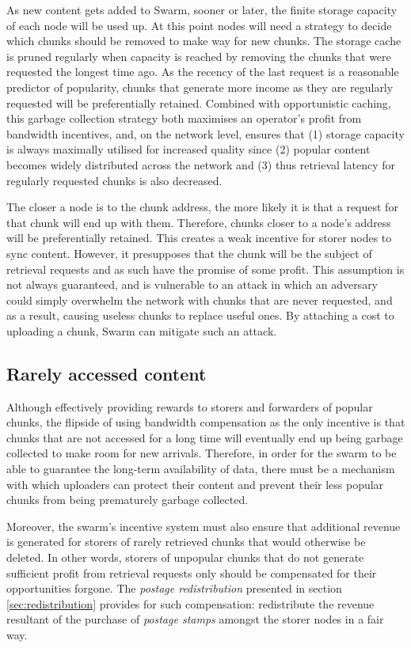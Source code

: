 As new content gets added to Swarm, sooner or later, the finite storage capacity of each node will be used up. At this point nodes will need a strategy to decide which chunks should be removed to make way for new chunks. 
The storage cache is pruned regularly when capacity is reached by removing the chunks that were requested the longest time ago. As the recency of the last request is a reasonable predictor of popularity, chunks that generate more income as they are regularly requested will be preferentially retained. Combined with opportunistic caching, this garbage collection strategy both maximises an operator's profit from bandwidth incentives, and, on the network level, ensures that (1) storage capacity is always maximally utilised for increased quality since (2) popular content becomes widely distributed across the network and (3) thus retrieval latency for regularly requested chunks is also decreased.

The closer a node is to the chunk address, the more likely it is that a request for that chunk will end up with them. Therefore, chunks closer to a node's address will be preferentially retained. This creates a weak incentive for storer nodes to sync content. However, it presupposes that the chunk will be the subject of retrieval requests and as such have the promise of some profit. This assumption is not always guaranteed, and is vulnerable to an attack in which an adversary could simply overwhelm the network with chunks that are never requested, and as a result, causing useless chunks to replace useful ones. By attaching a cost to uploading a chunk, Swarm can mitigate such an attack.

\subsection{Rarely accessed content}\label{sec:rarely-accessed-content}

Although effectively providing rewards to storers and forwarders of popular chunks, the flipside of using bandwidth compensation as the only incentive is that chunks that are not accessed for a long time will eventually end up being garbage collected to make room for new arrivals. Therefore, in order for the swarm to be able to guarantee the long-term availability of data, there must be a mechanism with which uploaders can protect their content and prevent their less popular chunks from being prematurely garbage collected.

Moreover, the swarm's incentive system must also ensure that additional revenue is generated for storers of rarely retrieved chunks that would otherwise be deleted. In other words, storers of unpopular chunks that do not generate sufficient profit from retrieval requests only should be compensated for their opportunities forgone. The \emph{postage redistribution} presented in section \ref{sec:redistribution} provides for such compensation: redistribute the revenue resultant of the purchase of \emph{postage stamps} amongst the storer nodes in a fair way.

